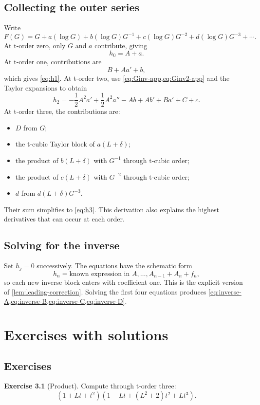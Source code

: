\documentclass[11pt,openany]{book}
\theoremstyle{definition}
\newtheorem{exercise}{Exercise}[chapter]
\theoremstyle{plain}
\theoremstyle{remark}
\begin{document}
\section{Collecting the outer series}
Write
\[
 F(G)=G+a(\log G)+b(\log G)G^{-1}
 +c(\log G)G^{-2}+d(\log G)G^{-3}+\cdots.
\]
At t-order zero, only \(G\) and \(a\) contribute, giving
\[
 h_0=A+a.
\]
At t-order one, contributions are
\[
 B+Aa'+b,
\]
which gives \cref{eq:h1}.  At t-order two, use
\cref{eq:Ginv-app,eq:Ginv2-app} and the Taylor expansions to obtain
\[
 h_2=-\frac12A^2a'+\frac12A^2a''-Ab+Ab'+Ba'+C+c.
\]
At t-order three, the contributions are:
\begin{itemize}
\item \(D\) from \(G\);
\item the t-cubic Taylor block of \(a(L+\delta)\);
\item the product of \(b(L+\delta)\) with \(G^{-1}\) through t-cubic order;
\item the product of \(c(L+\delta)\) with \(G^{-2}\) through t-cubic order;
\item \(d\) from \(d(L+\delta)G^{-3}\).
\end{itemize}
Their sum simplifies to \cref{eq:h3}.  This derivation also explains the
highest derivatives that can occur at each order.

\section{Solving for the inverse}
Set \(h_j=0\) successively.  The equations have the schematic form
\[
 h_n=\text{known expression in }A,\ldots,A_{n-1}+A_n+f_n,
\]
so each new inverse block enters with coefficient one.  This is the explicit
version of \cref{lem:leading-correction}.  Solving the first four equations
produces \cref{eq:inverse-A,eq:inverse-B,eq:inverse-C,eq:inverse-D}.

\chapter{Exercises with solutions}\label{app:exercises}

\section{Exercises}

\begin{exercise}[Product]
Compute through t-order three:
\[
 (1+Lt+t^2)(1-Lt+(L^2+2)t^2+Lt^3).
\]
\end{exercise}
\end{document}
